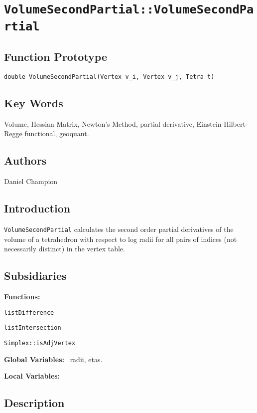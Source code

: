                       

\section*{\texttt{VolumeSecondPartial::VolumeSecondPartial}}

\subsection*{Function Prototype}

\texttt{double VolumeSecondPartial(Vertex v\_i, Vertex v\_j, Tetra t)}

\subsection*{Key Words}

Volume, Hessian Matrix, Newton's Method, partial derivative,
Einstein-Hilbert-Regge functional, geoquant.

\subsection*{Authors}

Daniel Champion

\subsection*{Introduction}

\texttt{VolumeSecondPartial} calculates the second order partial derivatives
of the volume of a tetrahedron with respect to log radii for all pairs of
indices (not necessarily distinct) in the vertex table. \ 

\subsection*{Subsidiaries}

\textbf{Functions:}

\texttt{listDifference}

\texttt{listIntersection}

\texttt{Simplex::isAdjVertex}

\textbf{Global Variables:} \ radii, etas.

\textbf{Local Variables:}

\subsection*{Description}

